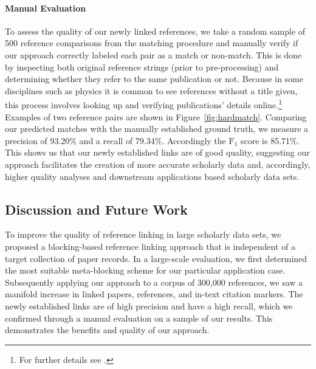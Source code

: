 \paragraph{Manual Evaluation}
To assess the quality of our newly linked references, we take a random sample of 500 reference comparisons from the matching procedure and manually verify if our approach correctly labeled each pair as a match or non-match. This is done by inspecting both original reference strings (prior to pre-processing) and determining whether they refer to the same publication or not. Because in some disciplines such as physics it is common to see references without a title given, this process involves looking up and verifying publications' details online.\footnote{For further details see .} Examples of two reference pairs are shown in Figure~\ref{fig:hardmatch}. Comparing our predicted matches with the manually established ground truth, we measure a precision of 93.20\% and a recall of 79.34\%. Accordingly the $\text{F}_1$ score is 85.71\%.
This shows us that our newly established links are of good quality, suggesting our approach facilitates the creation of more accurate scholarly data and, accordingly, higher quality analyses and downstream applications based scholarly data sets.

\subsection{Discussion and Future Work}
To improve the quality of reference linking in large scholarly data sets, we proposed a blocking-based reference linking approach that is independent of a target collection of paper records. In a large-scale evaluation, we first determined the most suitable meta-blocking scheme for our particular application case. Subsequently applying our approach to a corpus of 300,000 references, we saw a manifold increase in linked papers, references, and in-text citation markers. The newly established links are of high precision and have a high recall, which we confirmed through a manual evaluation on a sample of our results. This demonstrates the benefits and quality of our approach.

